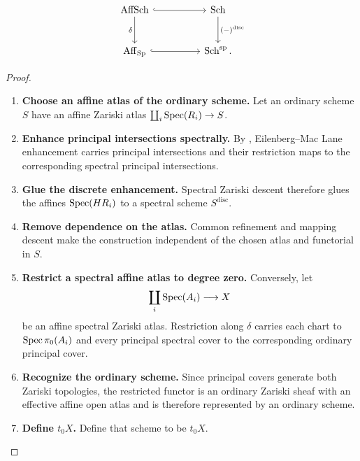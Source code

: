 \[
\begin{tikzcd}[column sep=huge, row sep=large]
    \operatorname{AffSch}
        \arrow[r, hook]
        \arrow[d, "\delta"']
    &
    \operatorname{Sch}
        \arrow[d, "{(-)^{\mathrm{disc}}}"]
    \\
    \Aff_{\Sp}
        \arrow[r, hook]
    &
    \operatorname{Sch}^{\mathrm{sp}}.
\end{tikzcd}
\]


\begin{proof}
\leavevmode
\begin{enumerate}[label=\textup{(\arabic*)}]
    \item \textbf{Choose an affine atlas of the ordinary scheme.}
    Let an ordinary scheme \(S\) have an affine Zariski atlas
    \(\coprod_i\operatorname{Spec}(R_i)\to S\).

    \item \textbf{Enhance principal intersections spectrally.}
    By
    , Eilenberg--Mac Lane
    enhancement carries principal intersections and their restriction maps to
    the corresponding spectral principal intersections.

    \item \textbf{Glue the discrete enhancement.}
    Spectral Zariski
    descent therefore glues the affines \(\operatorname{Spec}(HR_i)\) to a spectral scheme
    \(S^{\mathrm{disc}}\).

    \item \textbf{Remove dependence on the atlas.}
    Common refinement and mapping descent make the
    construction independent of the chosen atlas and functorial in \(S\).

    \item \textbf{Restrict a spectral affine atlas to degree zero.}
    Conversely, let
    \[
        \coprod_i\operatorname{Spec}(A_i)\longrightarrow X
    \]
    be an affine spectral Zariski atlas. Restriction along \(\delta\) carries
    each chart to \(\operatorname{Spec}\pi_0(A_i)\) and every principal spectral cover to
    the corresponding ordinary principal cover.

    \item \textbf{Recognize the ordinary scheme.}
    Since principal covers
    generate both Zariski topologies, the restricted functor is an ordinary
    Zariski sheaf with an effective affine open atlas and is therefore
    represented by an ordinary scheme.

    \item \textbf{Define \(t_0X\).}
    Define that scheme to be \(t_0X\).


\end{enumerate}
\end{proof}
